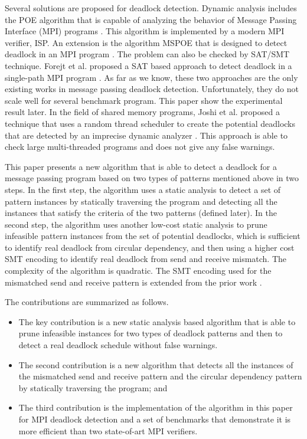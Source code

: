 Several solutions are proposed for deadlock detection. Dynamic analysis includes the POE algorithm that is capable of analyzing the behavior of Message Passing Interface (MPI) programs \cite{DBLP:conf/ppopp/VakkalankaSGK08}. This algorithm is implemented by a modern MPI verifier, ISP. An extension is the algorithm MSPOE that is designed to detect deadlock in an MPI program \cite{DBLP:conf/sbmf/SharmaGB12}. The problem can also be checked by SAT/SMT technique. Forejt et al. proposed a SAT based approach to detect deadlock in a single-path MPI program \cite{DBLP:conf/fm/ForejtKNS14}. As far as we know, these two approaches are the only existing works in message passing deadlock detection. Unfortunately, they do not scale well for several benchmark program. This paper show the experimental result later. In the field of shared memory programs, Joshi et al. proposed a technique that uses a random thread scheduler to create the potential deadlocks that are detected by an imprecise dynamic analyzer \cite{DBLP:conf/pldi/JoshiPSN09}. This approach is able to check large multi-threaded programs and does not give any false warnings. 

This paper presents a new algorithm that is able to detect a deadlock for a message passing program based on two types of patterns mentioned above in two steps. In the first step, the algorithm uses a static analysis to detect a set of pattern instances by statically traversing the program and detecting all the instances that satisfy the criteria of the two patterns (defined later). In the second step, the algorithm uses another low-cost static analysis to prune infeasible pattern instances from the set of potential deadlocks, which is sufficient to identify real deadlock from circular dependency, and then using a higher cost SMT encoding to identify real deadlock from send and receive mismatch. The complexity of the algorithm is quadratic. The SMT encoding used for the mismatched send and receive pattern is extended from the prior work \cite{DBLP:conf/kbse/HuangMM13,HuangNFM15}.  

The contributions are summarized as follows.
\begin{itemize}
\item The key contribution is a new static analysis based algorithm that is able to prune infeasible instances for two types of deadlock patterns and then to detect a real deadlock schedule without false warnings. 
\item The second contribution is a new algorithm that detects all the instances of the mismatched send and receive pattern and the circular dependency pattern by statically traversing the program; and
\item The third contribution is the implementation of the algorithm in this paper for MPI deadlock detection and a set of benchmarks that demonstrate it is more efficient than two state-of-art MPI verifiers.
\end{itemize}

